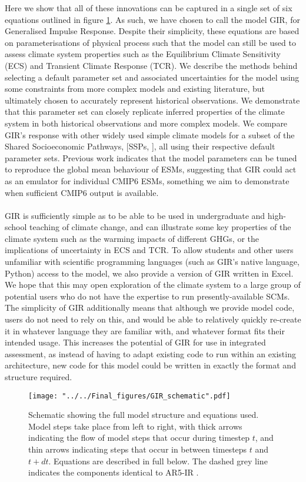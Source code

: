 \documentclass[gmd, manuscript]{copernicus}
\begin{document}
Here we show that all of these innovations can be captured in a single set of six equations outlined in figure \ref{fig:schematic}. As such, we have chosen to call the model GIR, for Generalised Impulse Response. Despite their simplicity, these equations are based on parameterisations of physical process such that the model can still be used to assess climate system properties such as the Equilibrium Climate Sensitivity (ECS) and Transient Climate Response (TCR). We describe the methods behind selecting a default parameter set and associated uncertainties for the model using some constraints from more complex models and existing literature, but ultimately chosen to accurately represent historical observations. We demonstrate that this parameter set can closely replicate inferred properties of the climate system in both historical observations and more complex models. We compare GIR’s response with other widely used simple climate models for a subset of the Shared Socioeconomic Pathways, [SSPs, \cite{Riahi2017}], all using their respective default parameter sets. Previous work \citep{Joos2013,Tsutsui2017} indicates that the model parameters can be tuned to reproduce the global mean behaviour of ESMs, suggesting that GIR could act as an emulator for individual CMIP6 ESMs, something we aim to demonstrate when sufficient CMIP6 output is available.\\\\
GIR is sufficiently simple as to be able to be used in undergraduate and high-school teaching of climate change, and can illustrate some key properties of the climate system such as the warming impacts of different GHGs, or the implications of uncertainty in ECS and TCR. To allow students and other users unfamiliar with scientific programming languages (such as GIR's native language, Python) access to the model, we also provide a version of GIR written in Excel. We hope that this may open exploration of the climate system to a large group of potential users who do not have the expertise to run presently-available SCMs. The simplicity of GIR additionally means that although we provide model code, users do not need to rely on this, and would be able to relatively quickly re-create it in whatever language they are familiar with, and whatever format fits their intended usage. This increases the potential of GIR for use in integrated assessment, as instead of having to adapt existing code to run within an existing architecture, new code for this model could be written in exactly the format and structure required.
\begin{figure}[t]
\texttt{[image: "../../Final\_figures/GIR\_schematic".pdf]}
\caption{Schematic showing the full model structure and equations used. Model steps take place from left to right, with thick arrows indicating the flow of model steps that occur during timestep $t$, and thin arrows indicating steps that occur in between timesteps $t$ and $t+dt$. Equations are described in full below. The dashed grey line indicates the components identical to AR5-IR \citep{Myhre2013a}.}
\label{fig:schematic}
\end{figure}
\end{document}
